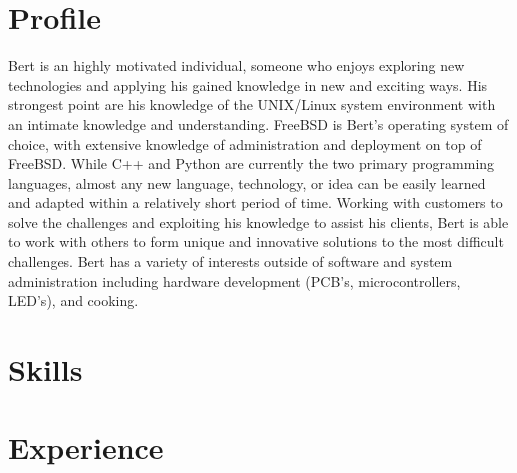 \documentclass[11pt,letterpaper,sans]{moderncv}        %
\begin{document}
\makecvtitle

\section{Profile}
Bert is an highly motivated individual, someone who enjoys exploring new technologies and applying his gained knowledge in new and exciting ways. His strongest point are his knowledge of the UNIX/Linux system environment with an intimate knowledge and understanding. FreeBSD is Bert's operating system of choice, with extensive knowledge of administration and deployment on top of FreeBSD. While C++ and Python are currently the two primary programming languages, almost any new language, technology, or idea can be easily learned and adapted within a relatively short period of time. Working with customers to solve the challenges and exploiting his knowledge to assist his clients, Bert is able to work with others to form unique and innovative solutions to the most difficult challenges. Bert has a variety of interests outside of software and system administration including hardware development (PCB's, microcontrollers, LED's), and cooking.

\section{Skills}


\section{Experience}
\end{document}
